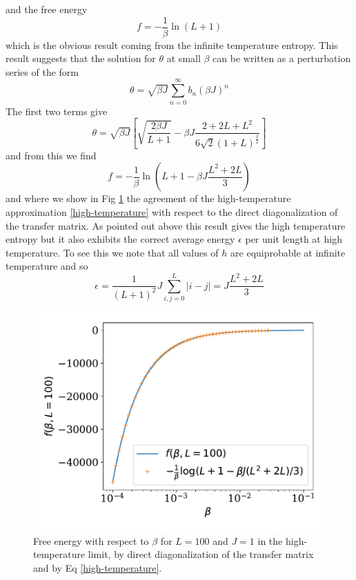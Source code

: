 and the free energy
\begin{equation}
f=-\frac{1}{\beta}\ln(L+1)
\end{equation}
which is the obvious result coming from the infinite temperature entropy. 
This result suggests that the solution for $\theta$ at small $\beta$ can be written as a perturbation series of the form
\begin{equation}
\theta = \sqrt{\beta J}\sum_{n=0}^\infty b_n (\beta J)^n
\end{equation}
The first two terms give
\begin{equation}
\theta = \sqrt{\beta J}\left[\sqrt{\frac{2\beta J}{L+1}} -\beta J \frac{2 + 2L +L^2}{6\sqrt{2}(1+L)^{\frac{3}{2}}}\right]
\end{equation}
and from this we find
\begin{equation}
f=-\frac{1}{\beta}\ln(L+1-\beta J\frac{L^2+2L}{3})
\label{high-temperature} 
\end{equation}
{\color{red} and where we show in Fig \ref{fig-high-temp} the agreement of the high-temperature approximation \eqref{high-temperature} with respect to the direct diagonalization of the transfer matrix.}
As pointed out above this result gives the high temperature entropy but it also exhibits the correct average energy $\epsilon$ per unit length at high temperature. To see this we note that all values of $h$ are equiprobable at infinite temperature and so
\begin{equation}
\epsilon = \frac{1}{(L+1)^2} J \sum_{i,j=0}^L |i-j| = J\frac{L^2+2L}{3}
\end{equation}

\begin{figure}
\centering
\includegraphics[width=0.7\linewidth]{finite-size/high_temperature.pdf}
\caption{Free energy with respect to $\beta$ for $L=100$ and $J=1$ in the high-temperature limit, by direct diagonalization of the transfer matrix and by Eq \eqref{high-temperature}.}
\label{fig-high-temp} 
\end{figure}



